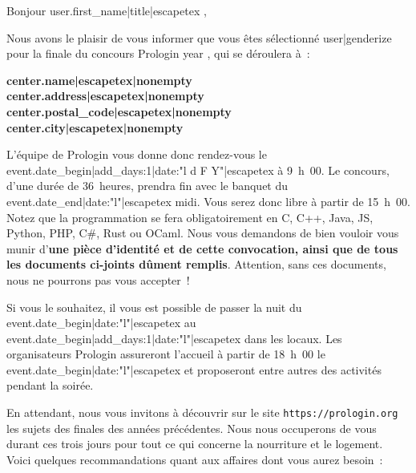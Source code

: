 \documentclass[a4paper,11pt]{article}
\begin{document}
\def\objet{Convocation à la finale Prologin {{ year }} }

{%
{%

\def\destinataire{%
{{ user.get_full_name|title|escapetex|nonempty }}\\
{{ user.address|escapetex|nonempty }}\\
{{ user.postal_code|escapetex|nonempty }} {{ user.city|escapetex|nonempty }}\\
{{ user.country|escapetex|nonempty }} %
}
\header

Bonjour {{ user.first_name|title|escapetex }},

Nous avons le plaisir de vous informer que vous êtes
sélectionné{{ user|genderize }}
pour la finale du concours Prologin {{ year }}, qui se déroulera à~:

{\par\smallskip\noindent\centering
\begin{minipage}{0.5\textwidth}
\textbf{%
{{ center.name|escapetex|nonempty }}%
}\\
\textbf{%
{{ center.address|escapetex|nonempty }}%
}\\
\textbf{%
{{ center.postal_code|escapetex|nonempty }} {{ center.city|escapetex|nonempty }}%
}
\end{minipage}
\par\smallskip}

L'équipe de Prologin vous donne donc rendez-vous le {{ event.date_begin|add_days:1|date:"l d F Y"|escapetex }}
à 9~h~00. Le concours, d'une durée de 36~heures, prendra fin avec le banquet du
{{ event.date_end|date:"l"|escapetex }} midi. Vous serez donc libre à partir de 15~h~00. Notez que la
programmation se fera obligatoirement en C, C++, Java, JS, Python, PHP, C\#,
 Rust ou OCaml. Nous vous demandons de bien vouloir vous munir d'\textbf{une
pièce d'identité et de cette convocation, ainsi que de tous les documents
ci-joints dûment remplis}. Attention, sans ces documents, nous ne pourrons pas
vous accepter~!

Si vous le souhaitez, il vous est possible de passer la nuit du
{{ event.date_begin|date:"l"|escapetex }} au
{{ event.date_begin|add_days:1|date:"l"|escapetex }} dans les locaux. Les
organisateurs Prologin assureront l'accueil à partir de 18~h~00 le
{{ event.date_begin|date:"l"|escapetex }} et proposeront entre autres des
activités pendant la soirée.

En attendant, nous vous invitons à découvrir sur le site
\texttt{https://prologin.org} les sujets des finales des années précédentes.
Nous nous occuperons de vous durant ces trois jours pour tout ce qui concerne
la nourriture et le logement. Voici quelques recommandations quant aux affaires
dont vous aurez besoin~:

}}
\end{document}
